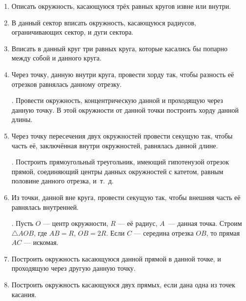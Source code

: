 \begin{enumerate}[resume]
\item
Описать окружность, касающуюся трёх равных кругов извне или внутри.

\item
В данный сектор вписать окружность, касающуюся радиусов, ограничивающих сектор, и дуги сектора.

\item
Вписать в данный круг три равных круга, которые касались бы попарно между собой и данного круга.

\item
Через точку, данную внутри круга, провести хорду так, чтобы разность её отрезков равнялась данному отрезку.

\smallskip
{}.
Провести окружность, концентрическую данной и проходящую через данную точку.
В этой окружности от данной точки построить хорду данной длины.


\item
Через точку пересечения двух окружностей провести секущую так, чтобы часть её, заключённая внутри окружностей, равнялась данной длине.

\smallskip
{}.
Построить прямоугольный треугольник, имеющий гипотенузой отрезок прямой, соединяющий центры данных окружностей с катетом, равным половине данного отрезка, и~т.~д.

\item
Из точки, данной вне круга, провести секущую так, чтобы внешняя часть её равнялась внутренней.

\smallskip
{}.
Пусть $O$ — центр окружности, $R$ — её радиус, $A$~— данная точка.
Строим $\triangle AOB$, где $AB=R$, $OB=2R$.
Если $C$ — середина отрезка $OB$, то прямая $AC$ — искомая.

\item
Построить окружность касающуюся данной прямой в данной точке, и проходящую через другую данную точку.

\item
Построить окружность касающуюся двух прямых, если дана одна из точек касания.

\end{enumerate}
